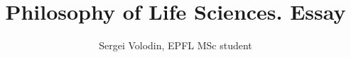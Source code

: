 \documentclass[a4]{article}
\title{Philosophy of Life Sciences. Essay}
\author{Sergei Volodin, EPFL MSc student}
\begin{document}
\maketitle

\begin{abstract}

\end{abstract}

\section{}
\end{document}

